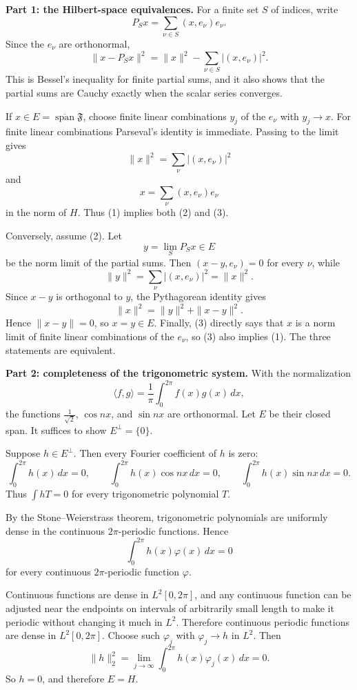 \begin{solution}
\textbf{Part 1: the Hilbert-space equivalences.}
For a finite set $S$ of indices, write
\[
P_Sx=\sum_{\nu\in S}(x,e_\nu)e_\nu .
\]
Since the $e_\nu$ are orthonormal,
\[
\|x-P_Sx\|^2=\|x\|^2-\sum_{\nu\in S}|(x,e_\nu)|^2.
\]
This is Bessel's inequality for finite partial sums, and it also shows that the partial sums are Cauchy exactly when the scalar series converges.

If $x\in E=\overline{\operatorname{span}}\mathfrak F$, choose finite linear combinations $y_j$ of the $e_\nu$ with $y_j\to x$. For finite linear combinations Parseval's identity is immediate. Passing to the limit gives
\[
\|x\|^2=\sum_\nu |(x,e_\nu)|^2
\]
and
\[
x=\sum_\nu (x,e_\nu)e_\nu
\]
in the norm of $H$. Thus (1) implies both (2) and (3).

Conversely, assume (2). Let
\[
y=\lim_S P_Sx\in E
\]
be the norm limit of the partial sums. Then $(x-y,e_\nu)=0$ for every $\nu$, while
\[
\|y\|^2=\sum_\nu |(x,e_\nu)|^2=\|x\|^2.
\]
Since $x-y$ is orthogonal to $y$, the Pythagorean identity gives
\[
\|x\|^2=\|y\|^2+\|x-y\|^2.
\]
Hence $\|x-y\|=0$, so $x=y\in E$. Finally, (3) directly says that $x$ is a norm limit of finite linear combinations of the $e_\nu$, so (3) also implies (1). The three statements are equivalent.

\textbf{Part 2: completeness of the trigonometric system.}
With the normalization
\[
\langle f,g\rangle=\frac{1}{\pi}\int_0^{2\pi}f(x)g(x)\,dx,
\]
the functions $\frac{1}{\sqrt2}$, $\cos nx$, and $\sin nx$ are orthonormal. Let $E$ be their closed span. It suffices to show $E^\perp=\{0\}$.

Suppose $h\in E^\perp$. Then every Fourier coefficient of $h$ is zero:
\[
\int_0^{2\pi}h(x)\,dx=0,\qquad
\int_0^{2\pi}h(x)\cos nx\,dx=0,\qquad
\int_0^{2\pi}h(x)\sin nx\,dx=0.
\]
Thus $\int hT=0$ for every trigonometric polynomial $T$.

By the Stone--Weierstrass theorem, trigonometric polynomials are uniformly dense in the continuous $2\pi$-periodic functions. Hence
\[
\int_0^{2\pi}h(x)\varphi(x)\,dx=0
\]
for every continuous $2\pi$-periodic function $\varphi$.

Continuous functions are dense in $L^2[0,2\pi]$, and any continuous function can be adjusted near the endpoints on intervals of arbitrarily small length to make it periodic without changing it much in $L^2$. Therefore continuous periodic functions are dense in $L^2[0,2\pi]$. Choose such $\varphi_j$ with $\varphi_j\to h$ in $L^2$. Then
\[
\|h\|_2^2=\lim_{j\to\infty}\int_0^{2\pi}h(x)\varphi_j(x)\,dx=0.
\]
So $h=0$, and therefore $E=H$.
\end{solution}

